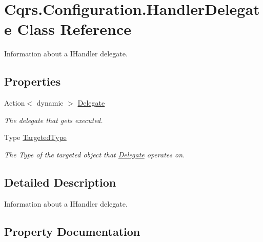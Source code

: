 \hypertarget{classCqrs_1_1Configuration_1_1HandlerDelegate}{}\section{Cqrs.\+Configuration.\+Handler\+Delegate Class Reference}
\label{classCqrs_1_1Configuration_1_1HandlerDelegate}


Information about a I\+Handler delegate.  


\subsection*{Properties}
\begin{DoxyCompactItemize}
\item 
Action$<$ dynamic $>$ \hyperlink{classCqrs_1_1Configuration_1_1HandlerDelegate_a67fe9f218e3202af02319f33483edb20_a67fe9f218e3202af02319f33483edb20}{Delegate}
\begin{DoxyCompactList}\small\item\em The delegate that gets executed. \end{DoxyCompactList}\item 
Type \hyperlink{classCqrs_1_1Configuration_1_1HandlerDelegate_ac88ee4620ae81fa214a562be2ce867f1_ac88ee4620ae81fa214a562be2ce867f1}{Targeted\+Type}
\begin{DoxyCompactList}\small\item\em The Type of the targeted object that \hyperlink{classCqrs_1_1Configuration_1_1HandlerDelegate_a67fe9f218e3202af02319f33483edb20_a67fe9f218e3202af02319f33483edb20}{Delegate} operates on. \end{DoxyCompactList}\end{DoxyCompactItemize}


\subsection{Detailed Description}
Information about a I\+Handler delegate. 



\subsection{Property Documentation}
\mbox{\label{classCqrs_1_1Configuration_1_1HandlerDelegate_a67fe9f218e3202af02319f33483edb20_a67fe9f218e3202af02319f33483edb20}} 
